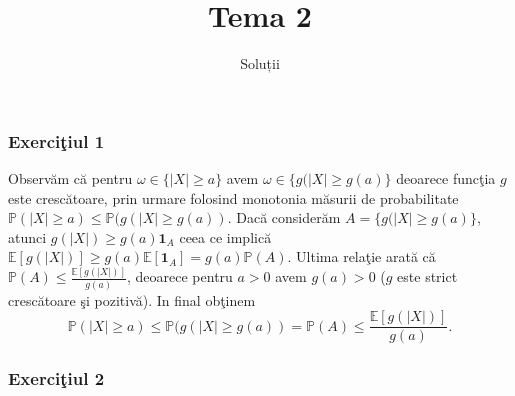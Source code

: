 \documentclass[]{article}
\title{Tema 2}
\subtitle{Soluții}
\author{}
\date{}
\def\om{\omega}
\def\1{{\mathbf 1}}
\def\PP{{\mathbb P}}
\def\EE{{\mathbb E}}
\begin{document}
\maketitle

\thispagestyle{fancy}

\subsubsection{\texorpdfstring{Exerci\c tiul
1}{Exerciiul 1}}\label{exerciiul-1}

Observ\u am c\u a pentru \(\om\in\{|X|\geq a\}\) avem
\(\om\in\{g(|X|\geq g(a)\}\) deoarece func\c tia \(g\) este
cresc\u atoare, prin urmare folosind monotonia m\u asurii de
probabilitate \(\PP(|X|\geq a)\leq\PP(g(|X|\geq g(a))\). Dac\u a
consider\u am \(A=\{g(|X|\geq g(a)\}\), atunci \(g(|X|)\geq g(a)\1_{A}\)
ceea ce implic\u a \(\EE[g(|X|)]\geq g(a)\EE[\1_A]=g(a)\PP(A)\). Ultima
rela\c tie arat\u a c\u a \(\PP(A)\leq\frac{\EE[g(|X|)]}{g(a)}\),
deoarece pentru \(a>0\) avem \(g(a)>0\) (\(g\) este strict
cresc\u atoare \c si pozitiv\u a). In final ob\c tinem \[
\PP(|X|\geq a)\leq\PP(g(|X|\geq g(a))=\PP(A)\leq\frac{\EE[g(|X|)]}{g(a)}.
\]

\subsubsection{\texorpdfstring{Exerci\c tiul
2}{Exerciiul 2}}\label{exerciiul-2}
\end{document}
